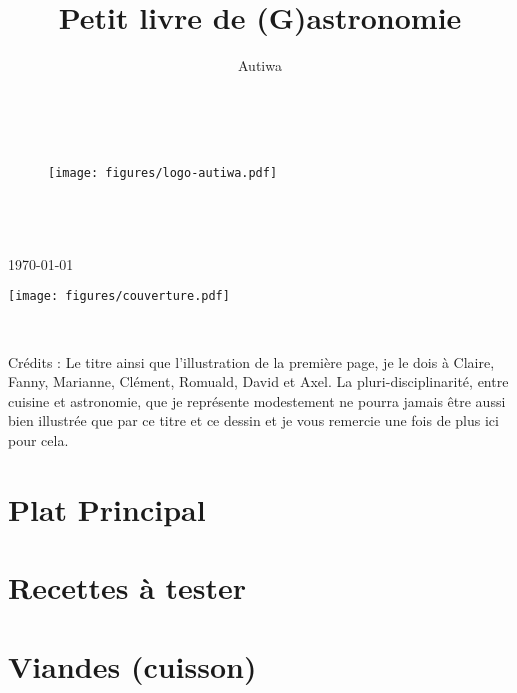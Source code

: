 \documentclass[a4paper,twoside,openright]{report}
\title{Petit livre de (G)astronomie}
\author{Autiwa}
\makeatletter
\def\cleardoublepage{\clearpage\if@twoside \ifodd\c@page\else
\hbox{} 
\thispagestyle{empty}
\newpage
\if@twocolumn\hbox{}\newpage\fi\fi\fi}
\makeatother
\begin{document}
\begin{titlepage}
\begin{center}
~
\vfill
\begin{figure}[t]
\centering
\texttt{[image: figures/logo-autiwa.pdf]}
\end{figure}

\HRule \\[0.4cm]
{ \huge \bfseries \makeatletter\@title\makeatother}\\[0.4cm]

\HRule \\[0.75cm]
{\large \today}\\[0.75cm]
\makeatletter
\@author
\makeatother
\vfill
\begin{center}
\texttt{[image: figures/couverture.pdf]}
\end{center}
\vfill
~


\end{center}
\end{titlepage}

\cleardoublepage
\null
\vfill
\noindent
Crédits : Le titre ainsi que l'illustration de la première page, je le dois à Claire, Fanny, Marianne, Clément, Romuald, David 
et Axel. La pluri-disciplinarité, entre cuisine et astronomie, que je représente modestement ne pourra jamais être aussi bien 
illustrée que par ce titre et ce dessin et je vous remercie une fois de plus ici pour cela.
\hfill
\cleardoublepage

\dominitoc
\tableofcontents
\cleardoublepage
\chapter{Plat Principal}
\minitoc



\chapter{Recettes à tester}
\minitoc



\chapter{Viandes (cuisson)}
\minitoc
\end{document}
